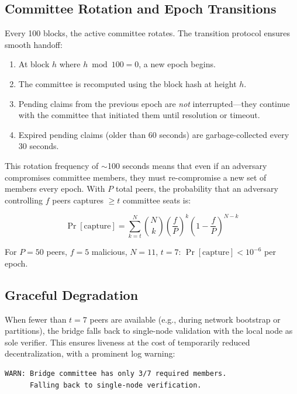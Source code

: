 \documentclass[11pt,a4paper]{article}
\begin{document}
\subsection{Committee Rotation and Epoch Transitions}

Every 100 blocks, the active committee rotates. The transition protocol ensures smooth handoff:

\begin{enumerate}
    \item At block $h$ where $h \bmod 100 = 0$, a new epoch begins.
    \item The committee is recomputed using the block hash at height $h$.
    \item Pending claims from the previous epoch are \emph{not} interrupted---they continue with the committee that initiated them until resolution or timeout.
    \item Expired pending claims (older than 60 seconds) are garbage-collected every 30 seconds.
\end{enumerate}

This rotation frequency of $\sim$100 seconds means that even if an adversary compromises committee members, they must re-compromise a new set of members every epoch. With $P$ total peers, the probability that an adversary controlling $f$ peers captures $\geq t$ committee seats is:

\begin{equation}
    \Pr[\text{capture}] = \sum_{k=t}^{N} \binom{N}{k} \left(\frac{f}{P}\right)^k \left(1 - \frac{f}{P}\right)^{N-k}
\end{equation}

For $P = 50$ peers, $f = 5$ malicious, $N = 11$, $t = 7$: $\Pr[\text{capture}] < 10^{-6}$ per epoch.

\subsection{Graceful Degradation}

When fewer than $t = 7$ peers are available (e.g., during network bootstrap or partitions), the bridge falls back to single-node validation with the local node as sole verifier. This ensures liveness at the cost of temporarily reduced decentralization, with a prominent log warning:

\begin{lstlisting}[language={}]
WARN: Bridge committee has only 3/7 required members.
      Falling back to single-node verification.
\end{lstlisting}
\end{document}
